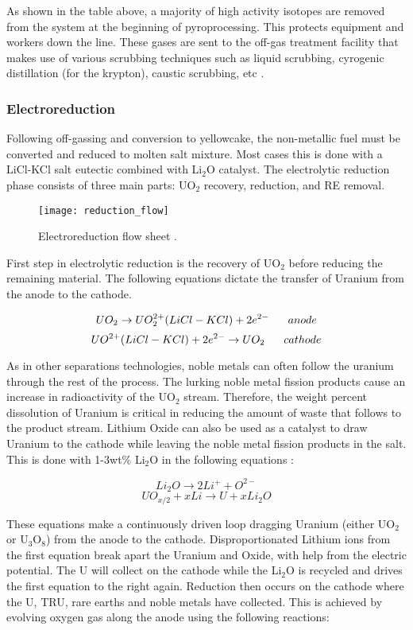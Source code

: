 As shown in the table above, a majority of high activity isotopes are removed from the system at the beginning of pyroprocessing. This protects equipment and workers down the line. These gases are sent to the off-gas treatment facility that makes use of various scrubbing techniques such as liquid scrubbing, cyrogenic distillation (for the krypton), caustic scrubbing, etc \cite{jubin_spent_2009}.

\subsubsection{Electroreduction}
Following off-gassing and conversion to yellowcake, the non-metallic fuel must be converted and reduced to molten salt mixture. Most cases this is done with a LiCl-KCl salt eutectic combined with Li$_2$O catalyst. The electrolytic reduction phase consists of three main parts: UO$_2$ recovery, reduction, and RE removal.

\begin{figure}[h]
	\centering
	\texttt{[image: reduction\_flow]}
	\caption{Electroreduction flow sheet \cite{ohta}.}
\end{figure}

First step in electrolytic reduction is the recovery of UO$_2$ before reducing the remaining material.
The following equations dictate the transfer of Uranium from the anode to the cathode.

\[ UO_2 \rightarrow UO_2^{2+}(LiCl-KCl) + 2e^{2-} \hspace{6mm} anode \]
\[ UO^{2+}(LiCl-KCl) + 2e^{2-} \rightarrow UO_2 \hspace{6mm} cathode \]

As in other separations technologies, noble metals can often follow the uranium through the rest of the process.
The lurking noble metal fission products cause an increase in radioactivity of the UO$_2$ stream. 
Therefore, the weight percent dissolution of Uranium is critical in reducing the amount of waste that follows to the product stream.
Lithium Oxide can also be used as a catalyst to draw Uranium to the cathode while leaving the noble metal fission products in the salt.
This is done with 1-3wt\% Li$_2$O in the following equations \cite{hur_electrochemical_nodate}:

\[ Li_2O \rightarrow 2Li^+ + O^{2-} \]
\[ UO_{x/2} + xLi \rightarrow U + xLi_2O \]

These equations make a continuously driven loop dragging Uranium (either UO$_2$ or U$_3$O$_8$) from the anode to the cathode. 
Disproportionated Lithium ions from the first equation break apart the Uranium and Oxide, with help from the electric potential.
The U will collect on the cathode while the Li$_2$O is recycled and drives the first equation to the right again. 
Reduction then occurs on the cathode where the U, TRU, rare earths and noble metals have collected.
This is achieved by evolving oxygen gas along the anode using the following reactions\cite{hur_electrochemical_nodate,organisation}:


